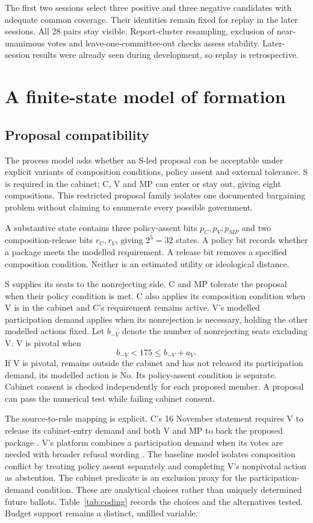 \documentclass[11pt,a4paper]{article}
\begin{document}
The first two sessions select three positive and three negative candidates with adequate common coverage. Their identities remain fixed for replay in the later sessions. All 28 pairs stay visible. Report-cluster resampling, exclusion of near-unanimous votes and leave-one-committee-out checks assess stability. Later-session results were already seen during development, so replay is retrospective.

\section{A finite-state model of formation}

\subsection{Proposal compatibility}

The process model asks whether an S-led proposal can be acceptable under explicit variants of composition conditions, policy assent and external tolerance. S is required in the cabinet; C, V and MP can enter or stay out, giving eight compositions. This restricted proposal family isolates one documented bargaining problem without claiming to enumerate every possible government.

A substantive state contains three policy-assent bits \(p_C,p_V,p_{MP}\) and two composition-release bits \(r_C,r_V\), giving \(2^5=32\) states. A policy bit records whether a package meets the modelled requirement. A release bit removes a specified composition condition. Neither is an estimated utility or ideological distance.

S supplies its seats to the nonrejecting side. C and MP tolerate the proposal when their policy condition is met. C also applies its composition condition when V is in the cabinet and C's requirement remains active. V's modelled participation demand applies when its nonrejection is necessary, holding the other modelled actions fixed. Let \(b_{-V}\) denote the number of nonrejecting seats excluding V. V is pivotal when
\[
b_{-V}<175\le b_{-V}+a_V.
\]
If V is pivotal, remains outside the cabinet and has not released its participation demand, its modelled action is No. Its policy-assent condition is separate. Cabinet consent is checked independently for each proposed member. A proposal can pass the numerical test while failing cabinet consent.

The source-to-rule mapping is explicit. C's 16 November statement requires V to release its cabinet-entry demand and both V and MP to back the proposed package \citep{cCondition}. V's platform combines a participation demand when its votes are needed with broader refusal wording \citep{vPlatform,vPlatformReadable}. The baseline model isolates composition conflict by treating policy assent separately and completing V's nonpivotal action as abstention. The cabinet predicate is an exclusion proxy for the participation-demand condition. These are analytical choices rather than uniquely determined future ballots. Table~\ref{tab:coding} records the choices and the alternatives tested. Budget support remains a distinct, unfilled variable.
\end{document}
